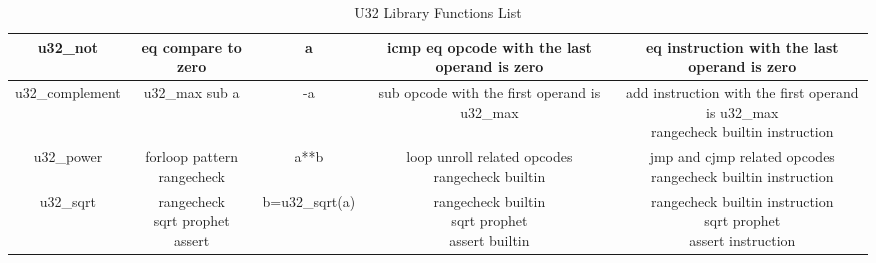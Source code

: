 \begin{table}[!htp]
{\begin{tabular}{|c|c|c|c|c|}
                u32\_not  & eq compare to zero & \!a & icmp eq opcode with the last operand is zero & eq instruction with the last operand is zero \\ \hline
                u32\_complement  & u32\_max sub a & -a & sub opcode with the first operand is u32\_max & \makecell{add instruction with the first operand is u32\_max \\ rangecheck builtin instruction}  \\ \hline
                u32\_power  & \makecell{forloop pattern \\ rangecheck} & a**b & \makecell{loop unroll related opcodes \\ rangecheck builtin} & \makecell{jmp and cjmp related opcodes \\ rangecheck builtin instruction} \\ \hline
                u32\_sqrt  & \makecell{rangecheck \\ sqrt prophet \\ assert} & b=u32_sqrt(a) & \makecell{rangecheck builtin \\ sqrt prophet \\ assert builtin} & \makecell{rangecheck builtin instruction\\ sqrt prophet \\ assert instruction} \\ \hline
            \end{tabular}}
        \caption{U32 Library Functions List}
        \label{table:u32-libFunctions-list}
    \end{table}